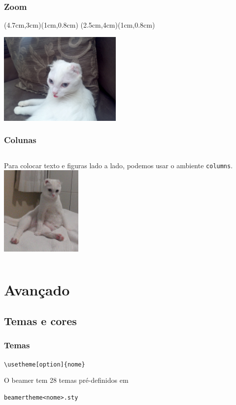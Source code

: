 \documentclass{beamer}
\newcommand{\kw}[1]{\textbackslash {\color{submerged}#1}}
\begin{document}
\begin{frame}[fragile]
   \frametitle{Zoom}
   (4.7cm,3cm)(1cm,0.8cm)
   (2.5cm,4cm)(1cm,0.8cm)
   \begin{center}
      \includegraphics[width=6cm]{imagens/penelope.jpg}
   \end{center}
   \lstset{frame=single}
\end{frame}

\begin{frame}
   \frametitle{Colunas}
   \begin{columns}
      Para colocar texto e figuras lado a lado, podemos usar o ambiente {\tt{\color{submerged}columns}}.
      \includegraphics[width=4cm]{imagens/barriga.jpg}
   \end{columns}
   \lstset{frame=single}
\end{frame}

\section{Avançado}

\subsection{Temas e cores}

\begin{frame}
   \frametitle{Temas}
   \begin{center}
      {\tt{\kw{usetheme}[option]\{nome\}}}
   \end{center}
   O beamer tem 28 temas pré-definidos em\\
   \begin{center}{\tt{beamertheme<nome>.sty}}\end{center}
\end{frame}
\end{document}

